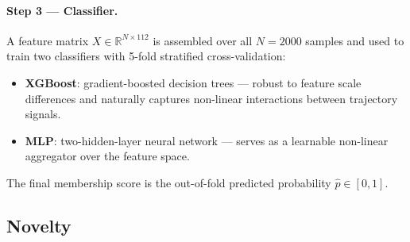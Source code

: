 \documentclass[11pt,a4paper]{article}
\begin{document}
\paragraph{Step 3 — Classifier.}
A feature matrix $X \in \mathbb{R}^{N \times 112}$ is assembled over all $N=2000$
samples and used to train two classifiers with 5-fold stratified cross-validation:
\begin{itemize}
  \item \textbf{XGBoost}: gradient-boosted decision trees — robust to feature scale
        differences and naturally captures non-linear interactions between trajectory
        signals.
  \item \textbf{MLP}: two-hidden-layer neural network — serves as a learnable
        non-linear aggregator over the feature space.
\end{itemize}
The final membership score is the out-of-fold predicted probability $\hat{p} \in [0,1]$.

\subsection{Novelty}
\end{document}
